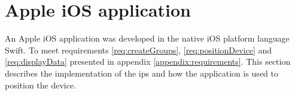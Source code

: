 \section{Apple iOS application}\label{sec:implApp}
An Apple iOS application was developed in the native iOS platform language Swift.
To meet requirements \ref{req:createGroups}, \ref{req:positionDevice} and \ref{req:displayData} presented in appendix \ref{appendix:requirements}.
This section describes the implementation of the \acrshort{ips} and how the application is used to position the device.





